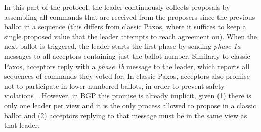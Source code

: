 In this part of the protocol, the leader continuously collects proposals by assembling all commands that are received from the proposers since the previous ballot in a sequence (this differs from classic Paxos, where it suffices to keep a single proposed value that the leader attempts to reach agreement on). When the next ballot is triggered, the leader starts the first phase by sending \textit{phase 1a} messages to all acceptors containing just the ballot number. Similarly to classic Paxos, acceptors reply with a \textit{phase 1b} message to the leader, which reports all sequences of commands they voted for. In classic Paxos, acceptors also promise not to participate in lower-numbered ballots, in order to prevent safety violations~\cite{Lamport:1998}. However, in BGP this promise is already implicit, given (1) there is only one leader per view and it is the only process allowed to propose in a classic ballot and (2) acceptors replying to that message must be in the same view as that leader.


